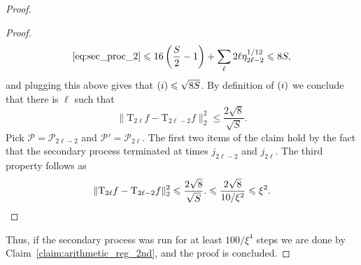 \documentclass[11pt]{article}
\newcommand\norm[1]{\| #1 \|}
\renewcommand\leq{\leqslant}
\newcommand{\rom}[1]{\uppercase\expandafter{\romannumeral #1\relax}}
\begin{document}
\begin{proof}
\begin{proof}
        \[
        \eqref{eq:sec_proc_2}\leq 16\left(\frac{S}{2}-1\right)+
        \sum\limits_{\ell}2\ell \eta_{2\ell-2}^{1/12}
        \leq 8S,
        \]
        and plugging this above gives that $(\rom{1})\leq \sqrt{8S}$. 
        By definition of $(\rom{1})$ 
        we conclude that there is $\ell$ such that
        \[
        \norm{\mathrm{T}_{2\ell} f - \mathrm{T}_{2\ell-2}f}_2^2\leq \frac{2\sqrt{8}}{\sqrt{S}}.
        \] 
    Pick $\mathcal{P} = \mathcal{P}_{2\ell-2}$ and 
    $\mathcal{P}'=\mathcal{P}_{2\ell}$. The first two items of the claim hold by the fact that the secondary process terminated at times $j_{2\ell-2}$ and $j_{2\ell}$. The third property follows as
  \[
        \norm{\mathrm{T}_{2\ell} f - \mathrm{T}_{2\ell-2}f}_2^2\leq \frac{2\sqrt{8}}{\sqrt{S}}.
        \leq \frac{2\sqrt{8}}{10/\xi^2}\leq \xi^2.
        \qedhere
        \] 
    \end{proof}
    Thus, if the secondary process was run for at least $100/\xi^4$ steps we are done by Claim~\ref{claim:arithmetic_reg_2nd}, and the proof is concluded.
\end{proof}
\end{document}
